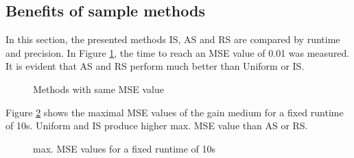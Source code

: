 \subsection{Benefits of sample methods}
In this section, the presented methods IS, AS and RS are compared by runtime
and precision.
In Figure \ref{graphic:methods_compare}, the time to reach an
MSE value of 0.01 was measured. It is evident that AS and RS perform
much better than Uniform or IS. 
\begin{figure}[H]
  \centerline{
    }
  \caption{Methods with same MSE value}
  \label{graphic:methods_compare}
\end{figure}
Figure \ref{graphic:methods_compare2} shows the maximal MSE values
of the gain medium for a fixed runtime of 10s. Uniform and IS 
produce higher max. MSE value than AS or RS.
\begin{figure}[H]
  \centerline{
    }
  \caption{max. MSE values for a fixed runtime of 10s}
  \label{graphic:methods_compare2}
\end{figure}
